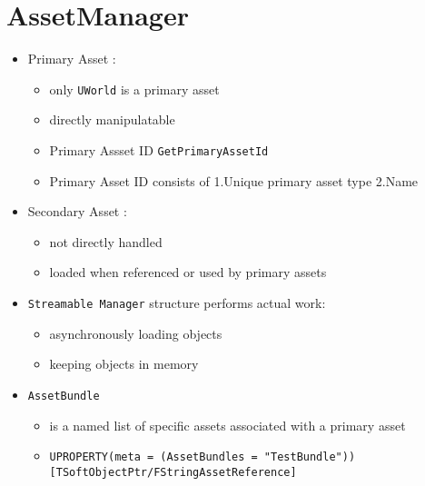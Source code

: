 \chapter{AssetManager}
    \begin{itemize}
        \item Primary Asset :
        \begin{itemize}
            \item only \colorbox{mygray}{\lstinline{UWorld}} is a primary asset
            \item directly manipulatable
            \item Primary Assset ID \colorbox{mygray}{\lstinline{GetPrimaryAssetId}}
            \item Primary Asset ID consists of 1.Unique primary asset type 2.Name
        \end{itemize}
        \item Secondary Asset :
        \begin{itemize}
            \item not directly handled
            \item loaded when referenced or used by primary assets
        \end{itemize}
        \item \colorbox{mygray}{\lstinline{Streamable Manager}} structure performs actual work:
        \begin{itemize}
            \item asynchronously loading objects
            \item keeping objects in memory
        \end{itemize}
        \item \colorbox{mygray}{\lstinline{AssetBundle}}
        \begin{itemize}
            \item is a named list of specific assets associated with a primary asset
            \item \colorbox{mygray}{\lstinline{UPROPERTY(meta = (AssetBundles = "TestBundle")) [TSoftObjectPtr/FStringAssetReference]}}
        \end{itemize}
    \end{itemize}